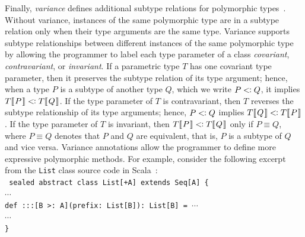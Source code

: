 Finally, \textit{variance} defines additional subtype relations for
polymorphic types~\cite{variance}.
Without variance,
instances of the same polymorphic type are in a subtype relation only
when their type arguments are the same type.
Variance supports subtype
relationships between different instances of the same polymorphic type
by allowing the programmer to label each type parameter of a class
\textit{covariant}, \textit{contravariant}, or \textit{invariant}.
If a parametric type $T$
has one covariant type parameter, then it preserves the subtype relation
of its type argument; hence, when a type $P$ is a subtype of another type
$Q$, which we write $P\extends Q$, it implies $T\ob{P}\extends T\ob{Q}$.
If the type parameter of $T$ is contravariant, then $T$ reverses the
subtype relationship of its type arguments; hence, $P\extends Q$ implies
$T\ob{Q}\extends T\ob{P}$.  If the type parameter of $T$ is invariant,
then
$T\ob{P}\extends T\ob{Q}$ only if $P\equiv Q$, where $P\equiv Q$ denotes
that $P$ and $Q$ are equivalent, that is, $P$ is a subtype of $Q$ and
vice versa.
Variance annotations allow the programmer to define more expressive polymorphic methods.
For example, consider the following excerpt from the
\texttt{List} class source code in Scala~\cite{scalalist}:\\[-.7em]

{\tt\setlength{\baselineskip}{.5\baselineskip}\noindent
\hspace*{5em}sealed abstract class List[+A] extends Seq[A] \{\\
\hspace*{7em}$\cdots$\\[-.4em]
\hspace*{7em}def :::[B >: A](prefix: List[B]): List[B] = $\cdots$\\[-.4em]
\hspace*{7em}$\cdots$\\[-.4em]
\hspace*{5em}\}
}
\\[-.7em]

